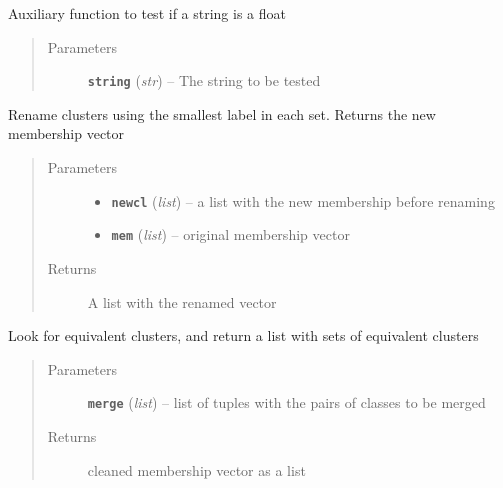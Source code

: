\documentclass[letterpaper,10pt,english]{sphinxmanual}
\begin{document}
\begin{fulllineitems}
\label{Doc:Moduler.isFloat}
Auxiliary function to test if a string is a float
\begin{quote}\begin{description}
\item[{Parameters}] \leavevmode
\textbf{\texttt{string}} (\emph{str}) -- The string to be tested

\end{description}\end{quote}

\end{fulllineitems}


\begin{fulllineitems}
\label{Doc:Moduler.rename_clusters}
Rename clusters using the smallest label in each set. Returns the new
membership vector
\begin{quote}\begin{description}
\item[{Parameters}] \leavevmode\begin{itemize}
\item {} 
\textbf{\texttt{newcl}} (\emph{list}) -- a list with the new membership before renaming

\item {} 
\textbf{\texttt{mem}} (\emph{list}) -- original membership vector

\end{itemize}

\item[{Returns}] \leavevmode
A list with the renamed vector

\end{description}\end{quote}

\end{fulllineitems}


\begin{fulllineitems}
\label{Doc:Moduler.equiclus}
Look for equivalent clusters, and return a list with sets of equivalent clusters
\begin{quote}\begin{description}
\item[{Parameters}] \leavevmode
\textbf{\texttt{merge}} (\emph{list}) -- list of tuples with the pairs of classes to be merged

\item[{Returns}] \leavevmode
cleaned membership vector as a list

\end{description}\end{quote}

\end{fulllineitems}
\end{document}
